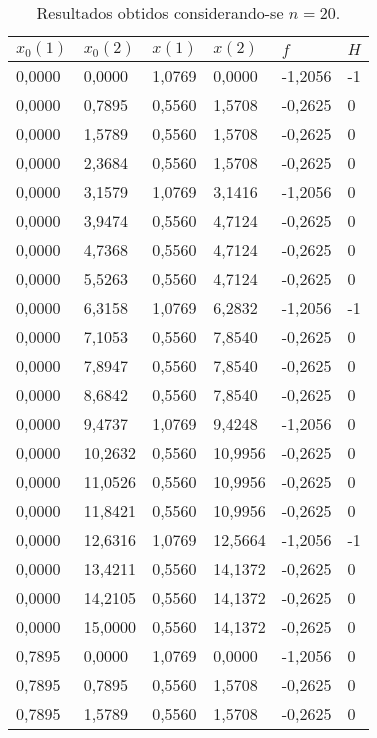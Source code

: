 \begin{longtable}{@{}llllll@{}} 
		\centering
		\caption{Resultados obtidos considerando-se $ n = 20 $.}
		\label{resultadosCompletos}
		\toprule
		$x_0(1)$     & $x_0(2)$     & $ x(1) $      & $ x(2) $      & $ f $        & $ H $  \\ \midrule
		\endhead
		0,0000  & 0,0000  & 1,0769  & 0,0000  & -1,2056  & -1 \\
		0,0000  & 0,7895  & 0,5560  & 1,5708  & -0,2625  & 0  \\
		0,0000  & 1,5789  & 0,5560  & 1,5708  & -0,2625  & 0  \\
		0,0000  & 2,3684  & 0,5560  & 1,5708  & -0,2625  & 0  \\
		0,0000  & 3,1579  & 1,0769  & 3,1416  & -1,2056  & 0  \\
		0,0000  & 3,9474  & 0,5560  & 4,7124  & -0,2625  & 0  \\
		0,0000  & 4,7368  & 0,5560  & 4,7124  & -0,2625  & 0  \\
		0,0000  & 5,5263  & 0,5560  & 4,7124  & -0,2625  & 0  \\
		0,0000  & 6,3158  & 1,0769  & 6,2832  & -1,2056  & -1 \\
		0,0000  & 7,1053  & 0,5560  & 7,8540  & -0,2625  & 0  \\
		0,0000  & 7,8947  & 0,5560  & 7,8540  & -0,2625  & 0  \\
		0,0000  & 8,6842  & 0,5560  & 7,8540  & -0,2625  & 0  \\
		0,0000  & 9,4737  & 1,0769  & 9,4248  & -1,2056  & 0  \\
		0,0000  & 10,2632 & 0,5560  & 10,9956 & -0,2625  & 0  \\
		0,0000  & 11,0526 & 0,5560  & 10,9956 & -0,2625  & 0  \\
		0,0000  & 11,8421 & 0,5560  & 10,9956 & -0,2625  & 0  \\
		0,0000  & 12,6316 & 1,0769  & 12,5664 & -1,2056  & -1 \\
		0,0000  & 13,4211 & 0,5560  & 14,1372 & -0,2625  & 0  \\
		0,0000  & 14,2105 & 0,5560  & 14,1372 & -0,2625  & 0  \\
		0,0000  & 15,0000 & 0,5560  & 14,1372 & -0,2625  & 0  \\
		0,7895  & 0,0000  & 1,0769  & 0,0000  & -1,2056  & 0  \\
		0,7895  & 0,7895  & 0,5560  & 1,5708  & -0,2625  & 0  \\
		0,7895  & 1,5789  & 0,5560  & 1,5708  & -0,2625  & 0  \\

\end{longtable}
